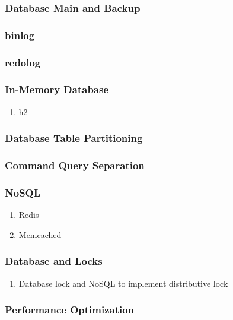 \documentclass[11pt, twocolumn]{article}
\begin{document}
\subsubsection{Database Main and Backup}

\subsubsection{binlog}

\subsubsection{redolog}

\subsubsection{In-Memory Database}
\begin{enumerate}
	\item h2
\end{enumerate}

\subsubsection{Database Table Partitioning}

\subsubsection{Command Query Separation}

\subsubsection{NoSQL}
\begin{enumerate}
	\item Redis
	\item Memcached
\end{enumerate}

\subsubsection{Database and Locks}
\begin{enumerate}
	\item Database lock and NoSQL to implement distributive lock
\end{enumerate}

\subsubsection{Performance Optimization}
\end{document}
